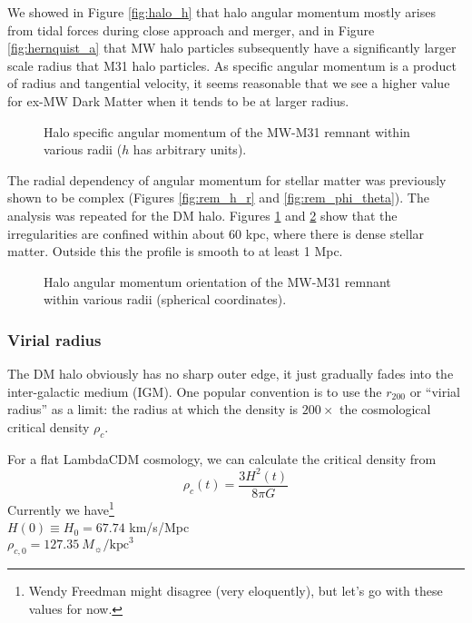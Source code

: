 \documentclass[twocolumn]{aastex63}
\newcommand{\todo}{\color{red}{TODO}\color{black}\hspace{2mm}}
\begin{document}
We showed in Figure \ref{fig:halo_h} that halo angular momentum mostly arises from tidal forces during close approach and merger, and in Figure \ref{fig:hernquist_a} that MW halo particles subsequently have a significantly larger scale radius that M31 halo particles. As specific angular momentum is a product of radius and tangential velocity, it seems reasonable that we see a higher value for ex-MW Dark Matter when it tends to be at larger radius.

\begin{figure}[htb!]
	\caption{Halo specific angular momentum of the MW-M31 remnant within various radii ($h$ has arbitrary units).
		\label{fig:rem_dm_h_r}}
\end{figure}

The radial dependency of angular momentum for stellar matter was previously shown to be complex (Figures \ref{fig:rem_h_r} and \ref{fig:rem_phi_theta}). The analysis was repeated for the DM halo. Figures \ref{fig:rem_dm_h_r} and \ref{fig:rem_dm_phi_theta} show that the irregularities are confined within about 60 kpc, where there is dense stellar matter. Outside this the profile is smooth to at least 1 Mpc.
	
\begin{figure}[htb!]
	\caption{Halo angular momentum orientation of the MW-M31 remnant within various radii (spherical coordinates).
		\label{fig:rem_dm_phi_theta}}
\end{figure}
	
\todo{DM density, shape, ellipse fitting}	

\subsubsection{Virial radius}

The DM halo obviously has no sharp outer edge, it just gradually fades into the inter-galactic medium (IGM). One popular convention is to use the $r_{200}$ or ``virial radius'' as a limit: the radius at which the density is $200\times$ the cosmological critical density $\rho_c$.

For a flat LambdaCDM cosmology, we can calculate the critical density from
\[ \rho_c(t) = \frac{3 H^2(t)}{8 \pi G} \] 
Currently \citep{planck_collaboration_planck_2016} we have\footnote{Wendy Freedman might disagree (very eloquently), but let's go with these values for now.} \\
$H(0) \equiv H_0 = 67.74$ km/s/Mpc \\
$\rho_{c,0} = 127.35\ M_\sun/\text{kpc}^3$
\end{document}
